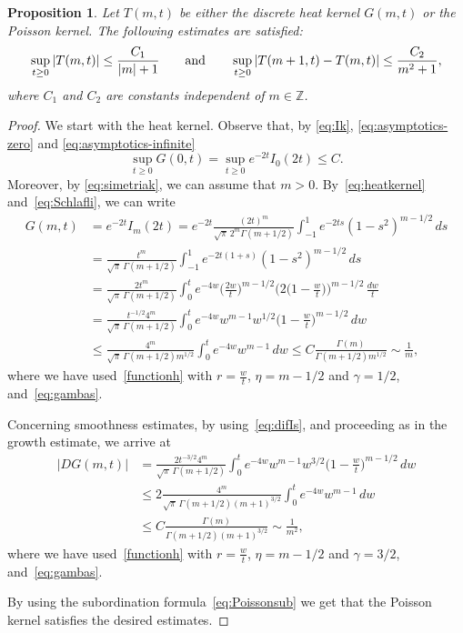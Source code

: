 \documentclass[11pt]{amsart}
\numberwithin{equation}{section}
\newcommand{\Z}{\mathbb{Z}}
\theoremstyle{plain}
\newtheorem{prop}{Proposition}
\theoremstyle{remark}
\begin{document}
\begin{prop}
\label{prop:heat-kernel-estimates}
Let $T(m,t)$ be either the  discrete heat kernel $G(m,t)$ or the Poisson kernel.
The following estimates are satisfied:
\[
\sup_{t\ge0}|T(m,t)|\le \frac{C_1}{|m|+1} \qquad \hbox{and} \qquad
\sup_{t\ge0}|T(m+1,t)-T(m,t) |\le \frac{C_2}{m^2+1},
\]
where $C_1$ and $C_2$ are constants independent of $m\in \Z$.
\end{prop}

\begin{proof}
We start with the heat kernel. Observe that, by \eqref{eq:Ik}, \eqref{eq:asymptotics-zero} and \eqref{eq:asymptotics-infinite}
\[
\sup_{t\ge0}G(0,t)=\sup_{t\ge0}e^{-2t}I_0(2t)\le C.
\]
Moreover, by \eqref{eq:simetriak}, we can assume that $m>0$.
By~\eqref{eq:heatkernel} and~\eqref{eq:Schlafli}, we can write
\begin{align*}
G(m,t) &= e^{-2t}I_m(2t)=e^{-2t}\frac{(2t)^m}{\sqrt{\pi}\,2^m\Gamma(m+1/2)}
\int_{-1}^1e^{-2ts}(1-s^2)^{m-1/2}\,ds\\
&= \frac{t^m}{\sqrt{\pi}\,\Gamma(m+1/2)} \int_{-1}^1e^{-2t(1+s)}(1-s^2)^{m-1/2}\,ds\\
&= \frac{2t^m}{\sqrt{\pi}\,\Gamma(m+1/2)} \int_{0}^te^{-4w}
\big(\tfrac{2w}{t}\big)^{m-1/2} \big(2\big(1-\tfrac{w}{t}\big)\big)^{m-1/2}\,
\tfrac{dw}{t}\\
&= \frac{t^{-1/2}4^m}{\sqrt{\pi}\,\Gamma(m+1/2)} \int_{0}^te^{-4w}w^{m-1}w^{1/2}
\big(1-\tfrac{w}{t}\big)^{m-1/2}\,dw\\
&\le \frac{4^m}{\sqrt{\pi}\,\Gamma(m+1/2)m^{1/2}}\int_{0}^te^{-4w}w^{m-1}\,dw
\le C\frac{\Gamma(m)}{\Gamma(m+1/2)m^{1/2}}\sim \frac{1}{m},
\end{align*}
where we have used~\eqref{functionh} with $r=\frac{w}{t}$, $\eta=m-1/2$ and $\gamma=1/2$, and~\eqref{eq:gambas}.

Concerning smoothness estimates, by using~\eqref{eq:difIs}, and proceeding as in the growth estimate, we arrive at
\begin{align*}
|DG(m,t)|
&=\frac{2t^{-3/2}4^m}{\sqrt{\pi}\,\Gamma(m+1/2)} \int_{0}^te^{-4w}w^{m-1}w^{3/2}
\big(1-\tfrac{w}{t}\big)^{m-1/2}\,dw\\
&\le 2\frac{4^m}{\sqrt{\pi}\,\Gamma(m+1/2)(m+1)^{3/2}} \int_{0}^te^{-4w}w^{m-1}\,dw\\
&\le C\frac{\Gamma(m)}{\Gamma(m+1/2)(m+1)^{3/2}} \sim \frac{1}{m^2},
\end{align*}
where we have used~\eqref{functionh} with $r=\frac{w}{t}$, $\eta=m-1/2$ and $\gamma=3/2$, and~\eqref{eq:gambas}.

By using the subordination formula~\eqref{eq:Poissonsub} we get that the Poisson kernel satisfies the desired estimates.
\end{proof}
\end{document}

